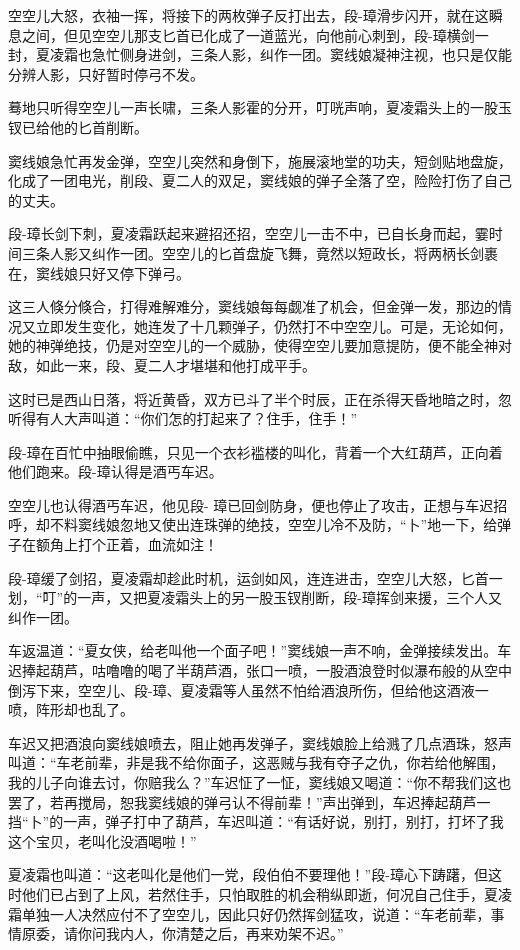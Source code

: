 \documentclass[12pt,oneside]{book}
\begin{document}
空空儿大怒，衣袖一挥，将接下的两枚弹子反打出去，段-璋滑步闪开，就在这瞬息之间，但见空空儿那支匕首已化成了一道蓝光，向他前心刺到，段-璋横剑一封，夏凌霜也急忙侧身进剑，三条人影，纠作一团。窦线娘凝神注视，也只是仅能分辨人影，只好暂时停弓不发。

蓦地只听得空空儿一声长啸，三条人影霍的分开，叮咣声响，夏凌霜头上的一股玉钗已给他的匕首削断。

窦线娘急忙再发金弹，空空儿突然和身倒下，施展滚地堂的功夫，短剑贴地盘旋，化成了一团电光，削段、夏二人的双足，窦线娘的弹子全落了空，险险打伤了自己的丈夫。

段-璋长剑下刺，夏凌霜跃起来避招还招，空空儿一击不中，已自长身而起，霎时间三条人影又纠作一团。空空儿的匕首盘旋飞舞，竟然以短政长，将两柄长剑裹在，窦线娘只好又停下弹弓。

这三人倏分倏合，打得难解难分，窦线娘每每觑准了机会，但金弹一发，那边的情况又立即发生变化，她连发了十几颗弹子，仍然打不中空空儿。可是，无论如何，她的神弹绝技，仍是对空空儿的一个威胁，使得空空儿要加意提防，便不能全神对敌，如此一来，段、夏二人才堪堪和他打成平手。

这时已是西山日落，将近黄昏，双方已斗了半个时辰，正在杀得天昏地暗之时，忽听得有人大声叫道：``你们怎的打起来了？住手，住手！''

段-璋在百忙中抽眼偷瞧，只见一个衣衫褴楼的叫化，背着一个大红葫芦，正向着他们跑来。段-璋认得是酒丐车迟。

空空儿也认得酒丐车迟，他见段-
璋已回剑防身，便也停止了攻击，正想与车迟招呼，却不料窦线娘忽地又使出连珠弹的绝技，空空儿冷不及防，``卜''地一下，给弹子在额角上打个正着，血流如注！

段-璋缓了剑招，夏凌霜却趁此时机，运剑如风，连连进击，空空儿大怒，匕首一划，``叮''的一声，又把夏凌霜头上的另一股玉钗削断，段-璋挥剑来援，三个人又纠作一团。

车返温道：``夏女侠，给老叫他一个面子吧！''窦线娘一声不响，金弹接续发出。车迟捧起葫芦，咕噜噜的喝了半葫芦酒，张口一喷，一股酒浪登时似瀑布般的从空中倒泻下来，空空儿、段-璋、夏凌霜等人虽然不怕给酒浪所伤，但给他这酒液一喷，阵形却也乱了。

车迟又把酒浪向窦线娘喷去，阻止她再发弹子，窦线娘脸上给溅了几点酒珠，怒声叫道：``车老前辈，非是我不给你面子，这恶贼与我有夺子之仇，你若给他解围，我的儿子向谁去讨，你赔我么？''车迟怔了一怔，窦线娘又喝道：``你不帮我们这也罢了，若再搅局，恕我窦线娘的弹弓认不得前辈！''声出弹到，车迟捧起葫芦一挡``卜''的一声，弹子打中了葫芦，车迟叫道：``有话好说，别打，别打，打坏了我这个宝贝，老叫化没酒喝啦！''

夏凌霜也叫道：``这老叫化是他们一党，段伯伯不要理他！''段-璋心下踌躇，但这时他们已占到了上风，若然住手，只怕取胜的机会稍纵即逝，何况自己住手，夏凌霜单独一人决然应付不了空空儿，因此只好仍然挥剑猛攻，说道：``车老前辈，事情原委，请你问我内人，你清楚之后，再来劝架不迟。''
\end{document}
